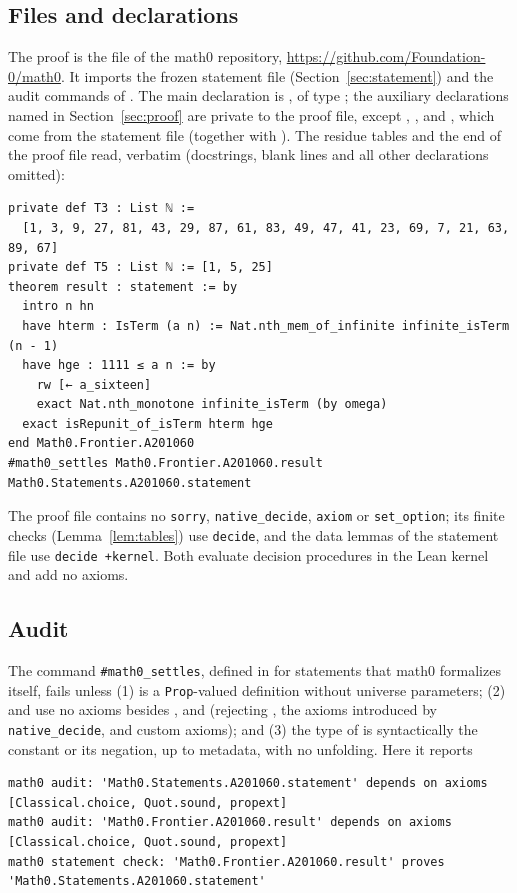 \documentclass[11pt]{amsart}
\theoremstyle{plain}
\theoremstyle{definition}
\begin{document}
\subsection*{Files and declarations}
The proof is the file  of the math0 repository, \url{https://github.com/Foundation-0/math0}. It imports the frozen statement file  (Section~\ref{sec:statement}) and the audit commands of . The main declaration is , of type ; the auxiliary declarations named in Section~\ref{sec:proof} are private to the proof file, except , ,  and , which come from the statement file (together with ). The residue tables and the end of the proof file read, verbatim (docstrings, blank lines and all other declarations omitted):
\begin{lstlisting}
private def T3 : List ℕ :=
  [1, 3, 9, 27, 81, 43, 29, 87, 61, 83, 49, 47, 41, 23, 69, 7, 21, 63, 89, 67]
private def T5 : List ℕ := [1, 5, 25]
theorem result : statement := by
  intro n hn
  have hterm : IsTerm (a n) := Nat.nth_mem_of_infinite infinite_isTerm (n - 1)
  have hge : 1111 ≤ a n := by
    rw [← a_sixteen]
    exact Nat.nth_monotone infinite_isTerm (by omega)
  exact isRepunit_of_isTerm hterm hge
end Math0.Frontier.A201060
#math0_settles Math0.Frontier.A201060.result Math0.Statements.A201060.statement
\end{lstlisting}
The proof file contains no \texttt{sorry}, \texttt{native\_decide}, \texttt{axiom} or \texttt{set\_option}; its finite checks (Lemma~\ref{lem:tables}) use \texttt{decide}, and the data lemmas of the statement file use \texttt{decide +kernel}. Both evaluate decision procedures in the Lean kernel and add no axioms.

\subsection*{Audit}
The command \texttt{\#math0\_settles}, defined in  for statements that math0 formalizes itself, fails unless (1)  is a \texttt{Prop}-valued definition without universe parameters; (2)  and  use no axioms besides ,  and  (rejecting , the axioms introduced by \texttt{native\_decide}, and custom axioms); and (3) the type of  is syntactically the constant  or its negation, up to metadata, with no unfolding. Here it reports
\begin{lstlisting}[basicstyle=\ttfamily\scriptsize]
math0 audit: 'Math0.Statements.A201060.statement' depends on axioms [Classical.choice, Quot.sound, propext]
math0 audit: 'Math0.Frontier.A201060.result' depends on axioms [Classical.choice, Quot.sound, propext]
math0 statement check: 'Math0.Frontier.A201060.result' proves 'Math0.Statements.A201060.statement'
\end{lstlisting}
\end{document}
